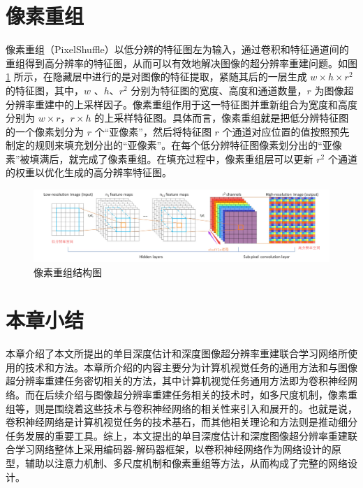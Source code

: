 \section{像素重组}

像素重组（PixelShuffle）以低分辨的特征图左为输入，通过卷积和特征通道间的重组得到高分辨率的特征图，从而可以有效地解决图像的超分辨率重建问题。如图 \ref{fig:fig2-15} 所示，在隐藏层中进行的是对图像的特征提取，紧随其后的一层生成 $w\times h\times r^2$ 的特征图，其中，$w$ 、$h$、$r^2$ 分别为特征图的宽度、高度和通道数量，$r$ 为图像超分辨率重建中的上采样因子。像素重组作用于这一特征图并重新组合为宽度和高度分别为 $w\times r$，$r\times h$ 的上采样特征图。具体而言，像素重组就是把低分辨特征图的一个像素划分为 $r$ 个“亚像素”，然后将特征图 $r$ 个通道对应位置的值按照预先制定的规则来填充划分出的“亚像素”。在每个低分辨特征图像素划分出的“亚像素”被填满后，就完成了像素重组。在填充过程中，像素重组层可以更新 $r^2$ 个通道的权重以优化生成的高分辨率特征图。

\begin{figure}[!htbp]
	\centering
	\includegraphics{figures/16.png}
	\caption{像素重组结构图}
	\label{fig:fig2-15}
	\vspace{-0.8cm}  %
\end{figure}


\section{本章小结}
本章介绍了本文所提出的单目深度估计和深度图像超分辨率重建联合学习网络所使用的技术和方法。本章所介绍的内容主要分为计算机视觉任务的通用方法和与图像超分辨率重建任务密切相关的方法，其中计算机视觉任务通用方法即为卷积神经网络。而在后续介绍与图像超分辨率重建任务相关的技术时，如多尺度机制，像素重组等，则是围绕着这些技术与卷积神经网络的相关性来引入和展开的。也就是说，卷积神经网络是计算机视觉任务的技术基石，而其他相关理论和方法则是推动细分任务发展的重要工具。综上，本文提出的单目深度估计和深度图像超分辨率重建联合学习网络整体上采用编码器-解码器框架，以卷积神经网络作为网络设计的原型，辅助以注意力机制、多尺度机制和像素重组等方法，从而构成了完整的网络设计。 

